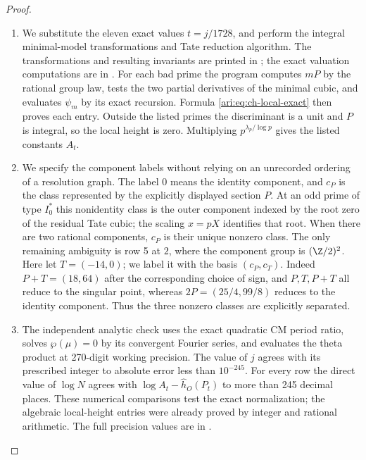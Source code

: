 \begin{proof}
\begin{enumerate}[label={$\langle1\rangle$\arabic*.},leftmargin=*]
\item We substitute the eleven exact values $t=j/1728$, and perform
the integral minimal-model transformations and Tate reduction
algorithm. The transformations and resulting invariants are
printed in ; the exact valuation
computations are in .
For each bad prime the program computes $mP$ by the rational
group law, tests the two partial derivatives of the minimal
cubic, and evaluates $\psi_m$ by its exact recursion. Formula
\eqref{ari:eq:ch-local-exact} then proves each entry. Outside the
listed primes the discriminant is a unit and $P$ is integral,
so the local height is zero. Multiplying $p^{\lambda_p/\log p}$
gives the listed constants $A_t$.

\item We specify the component labels without relying on an
unrecorded ordering of a resolution graph. The label $0$
means the identity component, and $c_P$ is the class represented
by the explicitly displayed section $P$. At an odd prime of
type $I_0^*$ this nonidentity class is the outer component
indexed by the root zero of the residual Tate cubic; the
scaling $x=pX$ identifies that root. When there are two
rational components, $c_P$ is their unique nonzero class.
The only remaining ambiguity is row 5 at $2$, where the
component group is $(\Z/2)^2$. Here let $T=(-14,0)$;
we label it with the basis $(c_P,c_T)$. Indeed
$P+T=(18,64)$ after the corresponding choice of sign,
and $P,T,P+T$ all reduce to the singular point, whereas
$2P=(25/4,99/8)$ reduces to the identity component.
Thus the three nonzero classes are explicitly separated.

\item The independent analytic check uses the exact quadratic CM
period ratio, solves $\wp(\mu)=0$ by its convergent Fourier
series, and evaluates the theta product at 270-digit working
precision. The value of $j$ agrees with its prescribed integer
to absolute error less than $10^{-245}$. For every row the
direct value of $\log N$ agrees with
$\log A_t-\widehat h_O(P_t)$ to more than 245 decimal places.
These numerical comparisons test the exact normalization;
the algebraic local-height entries were already proved by
integer and rational arithmetic. The full precision values
are in .
\end{enumerate}
\end{proof}
